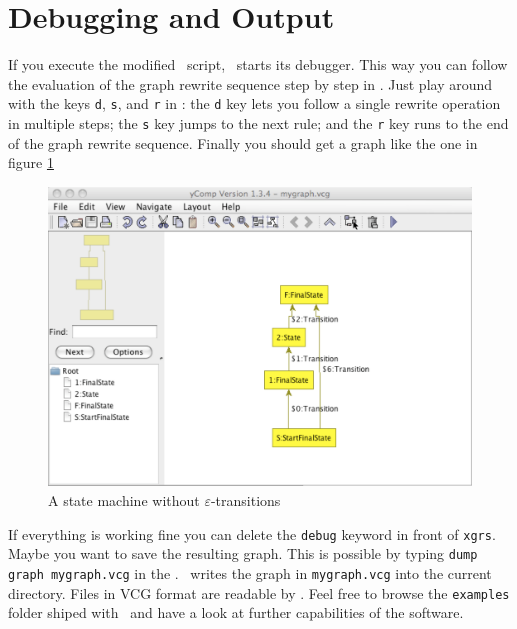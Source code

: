 \section{Debugging and Output}
If you execute the modified \GrShell\ script, \GrG\ starts its debugger.
This way you can follow the evaluation of the graph rewrite sequence step by step in \yComp.
Just play around with the keys \texttt{d}, \texttt{s}, and \texttt{r} in \GrShell: the \texttt{d} key lets you follow a single rewrite operation in multiple steps; the \texttt{s} key jumps to the next rule; and the \texttt{r} key runs to the end of the graph rewrite sequence.
Finally you should get a graph like the one in figure \ref{fig:quick:final}
\begin{figure}[htbp]
	\centering
	\includegraphics[width=0.8\linewidth]{fig/quickfinal}
	\caption{A state machine without $\varepsilon$-transitions}
	\label{fig:quick:final}
\end{figure}

If everything is working fine you can delete the \texttt{debug} keyword in front of \texttt{xgrs}.
Maybe you want to save the resulting graph.
This is possible by typing \texttt{dump graph mygraph.vcg} in the \GrShell.
\GrShell\ writes the graph in \texttt{mygraph.vcg} into the current directory.
Files in VCG format are readable by \yComp.
Feel free to browse the \texttt{examples} folder shiped with \GrG\ and have a look at further capabilities of the software.
